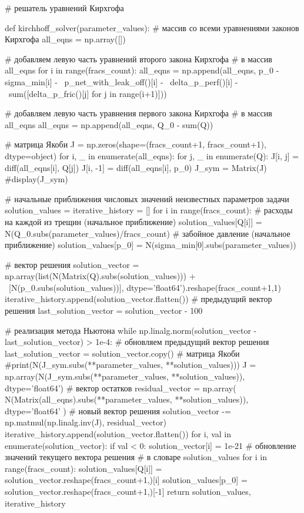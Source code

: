\begin{pythoncode}
# решатель уравнений Кирхгофа

def kirchhoff_solver(parameter_values):
    # массив со всеми уравнениями законов Кирхгофа
    all_eqns = np.array([])
    
    # добавляем левую часть уравнений второго закона Кирхгофа
    # в массив all_eqns
    for i in range(fracs_count):
        all_eqns = np.append(all_eqns, p_0 - sigma_min[i] - \
                             p_net_with_leak_off()[i] - \
                            delta_p_perf()[i] - \
                            sum([delta_p_fric()[j] for j in range(i+1)]))

    # добавляем левую часть уравнения первого закона Кирхгофа
    # в массив all_eqns
    all_eqns = np.append(all_eqns, Q_0 - sum(Q))
    
    # матрица Якоби
    J = np.zeros(shape=(fracs_count+1, fracs_count+1), dtype=object)
    for i, _ in enumerate(all_eqns):
        for j, _ in enumerate(Q):
            J[i, j] = diff(all_eqns[i], Q[j])
        J[i, -1] = diff(all_eqns[i], p_0)
    J_sym = Matrix(J)
    #display(J_sym)

    # начальные приближения числовых значений неизвестных параметров задачи
    solution_values = {}
    iterative_history = []
    for i in range(fracs_count):
        # расходы на каждой из трещин (начальное приближение)
        solution_values[Q[i]] = N(Q_0.subs(parameter_values)/fracs_count)
    # забойное давление (начальное приближение)
    solution_values[p_0] = N(sigma_min[0].subs(parameter_values))

    # вектор решения
    solution_vector = np.array(list(N(Matrix(Q).subs(solution_values))) + \
                               [N(p_0.subs(solution_values))],
                               dtype='float64').reshape(fracs_count+1,1)
    iterative_history.append(solution_vector.flatten())
    # предыдущий вектор решения
    last_solution_vector = solution_vector - 100

    # реализация метода Ньютона
    while np.linalg.norm(solution_vector - last_solution_vector) > 1e-4:
        # обновляем предыдущий вектор решения
        last_solution_vector = solution_vector.copy()
        # матрица Якоби
        #print(N(J_sym.subs({**parameter_values, **solution_values})))
        J = np.array(N(J_sym.subs({**parameter_values, **solution_values})),
                     dtype='float64')
        # вектор остатков
        residual_vector = np.array(
            N(Matrix(all_eqns).subs({**parameter_values, **solution_values})),
            dtype='float64'
        )
        # новый вектор решения
        solution_vector -= np.matmul(np.linalg.inv(J), residual_vector)
        iterative_history.append(solution_vector.flatten())
        for i, val in enumerate(solution_vector):
            if val < 0:
                solution_vector[i] = 1e-21
        # обновление значений текущего вектора решения
        # в словаре solution_values
        for i in range(fracs_count):
            solution_values[Q[i]] = solution_vector.reshape(fracs_count+1,)[i]
        solution_values[p_0] = solution_vector.reshape(fracs_count+1,)[-1]
    return solution_values, iterative_history	
\end{pythoncode}


